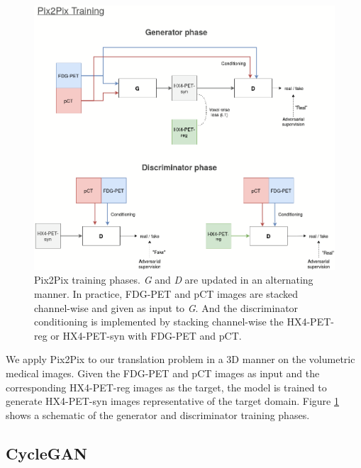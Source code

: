 \begin{figure}[h!]
    \centering
    \includegraphics[width=0.9\linewidth]{figures/GANs/Pix2Pix.png}
    \caption{Pix2Pix training phases. \textit{G} and \textit{D} are updated in an alternating manner. In practice, FDG-PET and pCT images are stacked channel-wise and given as input to \textit{G}. And the discriminator conditioning is implemented by stacking channel-wise the HX4-PET-reg or HX4-PET-syn with FDG-PET and pCT.}
    \label{fig:pix2pix}
\end{figure}{}

We apply Pix2Pix to our translation problem in a 3D manner on the volumetric medical images. Given the FDG-PET and pCT images as input and the corresponding HX4-PET-reg images as the target, the model is trained to generate HX4-PET-syn images representative of the target domain. Figure \ref{fig:pix2pix} shows a schematic of the generator and discriminator training phases.


\subsection{CycleGAN}
\label{cyclegan}

